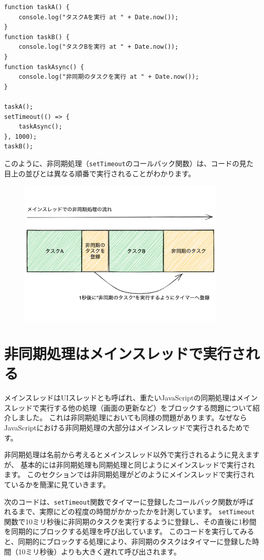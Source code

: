 \begin{lstlisting}
function taskA() {
    console.log("タスクAを実行 at " + Date.now());
}
function taskB() {
    console.log("タスクBを実行 at " + Date.now());
}
function taskAsync() {
    console.log("非同期のタスクを実行 at " + Date.now());
}

taskA();
setTimeout(() => {
    taskAsync();
}, 1000);
taskB();
\end{lstlisting}

このように、非同期処理（\texttt{setTimeout}のコールバック関数）は、コードの見た目上の並びとは異なる順番で実行されることがわかります。
\vspace{-4mm}
\begin{figure}[h]
\centering
\includegraphics[width=100mm]{fig/async-single-thread-tasks.pdf}
\end{figure}

\hypertarget{async-and-main-thread}{%
\section{非同期処理はメインスレッドで実行される}\label{async-and-main-thread}}

メインスレッドはUIスレッドとも呼ばれ、重たいJavaScriptの同期処理はメインスレッドで実行する他の処理（画面の更新など）をブロックする問題について紹介しました。
これは非同期処理においても同様の問題があります。なぜならJavaScriptにおける非同期処理の大部分はメインスレッドで実行されるためです。

非同期処理は名前から考えるとメインスレッド以外で実行されるように見えますが、
基本的には非同期処理も同期処理と同じようにメインスレッドで実行されます。
このセクションでは非同期処理がどのようにメインスレッドで実行されているかを簡潔に見ていきます。

次のコードは、\texttt{setTimeout}関数でタイマーに登録したコールバック関数が呼ばれるまで、実際にどの程度の時間がかかったかを計測しています。
\texttt{setTimeout}関数で10ミリ秒後に非同期のタスクを実行するように登録し、その直後に1秒間を同期的にブロックする処理を呼び出しています。
このコードを実行してみると、同期的にブロックする処理により、非同期のタスクはタイマーに登録した時間（10ミリ秒後）よりも大きく遅れて呼び出されます。

